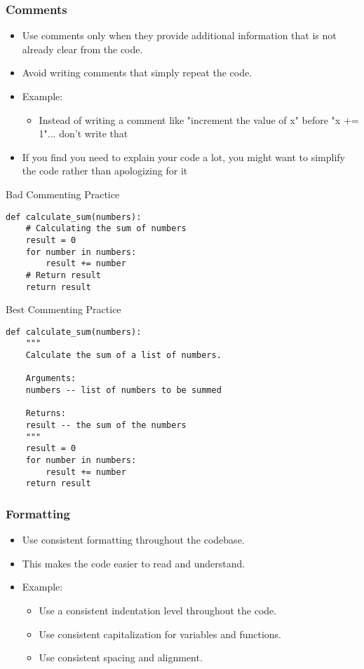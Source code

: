 \documentclass{beamer}
\begin{document}
\begin{frame}[fragile]
\frametitle{Comments}

\begin{itemize}
\item Use comments only when they provide additional information that is not already clear from the code.
\item Avoid writing comments that simply repeat the code.
\item Example:
\begin{itemize}
\item Instead of writing a comment like "increment the value of x" before "x += 1"... don't write that
\end{itemize}
\item If you find you need to explain your code a lot, you might want to simplify the code rather than apologizing for it
\end{itemize}
\end{frame}


\begin{frame}[fragile]{Bad Commenting Practice}
\begin{lstlisting}[style=Python]
def calculate_sum(numbers):
    # Calculating the sum of numbers
    result = 0
    for number in numbers:
        result += number
    # Return result
    return result
\end{lstlisting}
\end{frame}

\begin{frame}[fragile]{Best Commenting Practice}
\begin{lstlisting}[style=Python]
def calculate_sum(numbers):
    """
    Calculate the sum of a list of numbers.

    Arguments:
    numbers -- list of numbers to be summed

    Returns:
    result -- the sum of the numbers
    """
    result = 0
    for number in numbers:
        result += number
    return result
\end{lstlisting}
\end{frame}



\begin{frame}[fragile]
\frametitle{Formatting}

\begin{itemize}
\item Use consistent formatting throughout the codebase.
\item This makes the code easier to read and understand.
\item Example:
\begin{itemize}
\item Use a consistent indentation level throughout the code.
\item Use consistent capitalization for variables and functions.
\item Use consistent spacing and alignment.
\end{itemize}
\end{itemize}
\end{frame}
\end{document}
